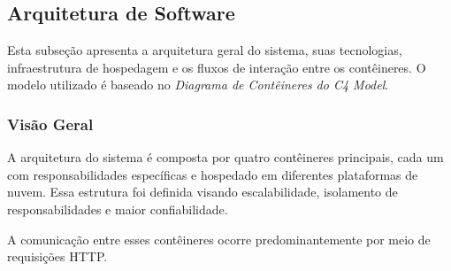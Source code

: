 \documentclass[
	article,			%
	12pt,				%
	oneside,			%
	a4paper,			%
    BIBLATEX,           %
	english,			%
	brazil,				%
	sumario=tradicional
	]{abntex2}
\begin{document}
\newpage

\subsection{Arquitetura de Software}

Esta subseção apresenta a arquitetura geral do sistema, suas tecnologias, infraestrutura de hospedagem e os fluxos de interação entre os contêineres. O modelo utilizado é baseado no \textit{Diagrama de Contêineres do C4 Model}.

\subsubsection{Visão Geral}

A arquitetura do sistema é composta por quatro contêineres principais, cada um com responsabilidades específicas e hospedado em diferentes plataformas de nuvem. Essa estrutura foi definida visando escalabilidade, isolamento de responsabilidades e maior confiabilidade.

A comunicação entre esses contêineres ocorre predominantemente por meio de requisições HTTP.
\end{document}
